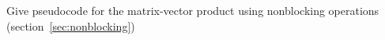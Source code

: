   Give pseudocode for the matrix-vector product using
  nonblocking operations (section~\ref{sec:nonblocking})
